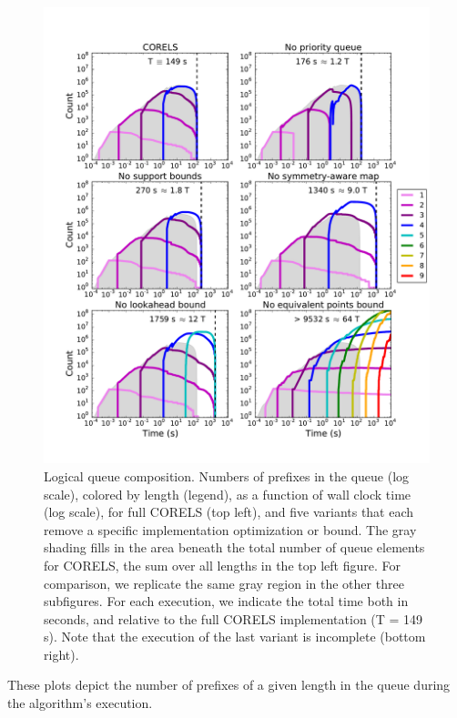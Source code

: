 \begin{figure}[t!]
\begin{center}
\includegraphics[trim={15mm 20mm 5mm 25mm},
width=\textwidth]{figs/kdd_compas_ablation-queue.pdf}
\end{center}
\vspace{-5mm}
\caption{Logical queue composition.
%
Numbers of prefixes in the queue (log scale), colored by length (legend),
as a function of wall clock time (log scale), for full CORELS (top left),
and five variants that each remove a specific implementation optimization or bound.
%
The gray shading fills in the area beneath the total number of
queue elements for CORELS,
\ie the sum over all lengths in the top left figure.
%
For comparison, we replicate the same gray region
in the other three subfigures.
%
For each execution, we indicate the total time both in seconds,
and relative to the full CORELS implementation (T = 149 s).
%
Note that the execution of the last variant is incomplete (bottom right).
}
\label{fig:queue}
\end{figure}
%
These plots depict the number of prefixes of a given length in the queue
during the algorithm's execution.
